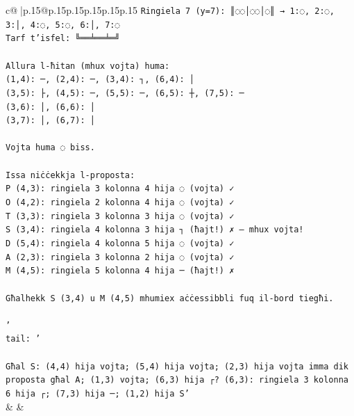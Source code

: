 \documentclass{article}
\begin{document}
{\begin{supertabular}{c@{$\;$}|p{.15\linewidth}@{}p{.15\linewidth}p{.15\linewidth}p{.15\linewidth}p{.15\linewidth}p{.15\linewidth}}
{{{\texttt{Ringiela 7 (y=7): ║◌◌│◌◌│◌║ → 1:◌, 2:◌, 3:│, 4:◌, 5:◌, 6:│, 7:◌} \\
\texttt{Tarf t'isfel: ╚══╧══╧═╝} \\
\\ 
\texttt{Allura l{-}ħitan (mhux vojta) huma:} \\
\texttt{(1,4): ─, (2,4): ─, (3,4): ┐, (6,4): │} \\
\texttt{(3,5): ├, (4,5): ─, (5,5): ─, (6,5): ┼, (7,5): ─} \\
\texttt{(3,6): │, (6,6): │} \\
\texttt{(3,7): │, (6,7): │} \\
\\ 
\texttt{Vojta huma ◌ biss.} \\
\\ 
\texttt{Issa niċċekkja l{-}proposta:} \\
\texttt{P (4,3): ringiela 3 kolonna 4 hija ◌ (vojta) ✓} \\
\texttt{O (4,2): ringiela 2 kolonna 4 hija ◌ (vojta) ✓} \\
\texttt{T (3,3): ringiela 3 kolonna 3 hija ◌ (vojta) ✓} \\
\texttt{S (3,4): ringiela 4 kolonna 3 hija ┐ (ħajt!) ✗ — mhux vojta!} \\
\texttt{D (5,4): ringiela 4 kolonna 5 hija ◌ (vojta) ✓} \\
\texttt{A (2,3): ringiela 3 kolonna 2 hija ◌ (vojta) ✓} \\
\texttt{M (4,5): ringiela 5 kolonna 4 hija ─ (ħajt!) ✗} \\
\\ 
\texttt{Għalhekk S (3,4) u M (4,5) mhumiex aċċessibbli fuq il{-}bord tiegħi.} \\
\\ 
\texttt{'} \\
\texttt{tail: '} \\
\\ 
\texttt{Għal S: (4,4) hija vojta; (5,4) hija vojta; (2,3) hija vojta imma dik proposta għal A; (1,3) vojta; (6,3) hija ┌? (6,3): ringiela 3 kolonna 6 hija ┌; (7,3) hija ─; (1,2) hija S'} \\
            }
        }
    }
    & & \\ \\


\end{supertabular}}
\end{document}
